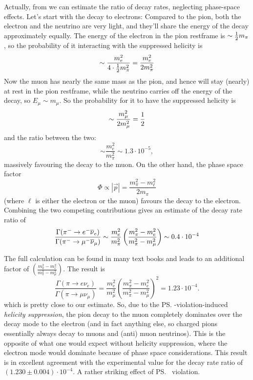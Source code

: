 Actually, from \label{eq:wrongHeliProb} we can estimate the ratio of
 decay rates, neglecting phase-space effects. Let's start with the
 decay to electrons: Compared to the pion, both the electron and the
 neutrino are very light, and they'll share the energy of the decay
 approximately equally. The energy of the electron in the pion
 restframe is $\sim \frac{1}{2} m_{\pi}$, so the probability of it
 interacting with the suppressed helicity is
\begin{equation}
 \sim \frac{m_e^2}{4 \cdot \frac{1}{2} m_{\pi}^2}
 = \frac{m_e^2}{2 m_{\pi}^2}
\end{equation}
 Now the muon has nearly the same mass as the pion, and hence will
 stay (nearly) at rest in the pion restframe, while the neutrino
 carries off the energy of the decay, so $E_{\mu} \sim m_{\mu}$. So
 the probability for it to have the suppressed helicity is
\begin{equation}
 \sim \frac{m_{\mu}^2}{2 m_{\mu}^2} = \frac{1}{2}
\end{equation}
 and the ratio between the two:
\begin{equation}
 \sim \frac{m_e^2}{m_{\pi}^2} \sim 1.3\cdot 10^{-5},
\end{equation}
 massively favouring the decay to the muon.
 On the other hand, the phase space factor
 \begin{equation}
 \Phi \propto |\vec{p}| = 
 \frac{m^2_{\pi} - m^2_{\ell}}{2 m_{\pi}}
 \end{equation}
(where $\ell$ is either the electron or the muon) favours the decay to the electron. Combining the two competing contributions gives an estimate of the decay rate ratio of
 \begin{equation}
 \frac{\Gamma({\rm \pi^-} \to e^- \overline{\nu}_e)}{
    \Gamma({\rm \pi^-} \to \mu^- \overline{\nu}_{\mu})}
\sim
 \frac{m_e^2}{m_{\pi}^2} 
    \left(
     \frac{m^2_{\pi} - m^2_{e}}{
     m^2_{\pi} - m^2_{\mu}}
    \right)
 \sim 0.4\cdot 10^{-4}
\end{equation}


 The full calculation can be found in many text
 books and leads to an additional factor of 
 $\left(
     \frac{m^2_{\pi} - m^2_{e}}{
     m^2_{\pi} - m^2_{\mu}}
    \right)$. 
The result is
\begin{equation}
 \frac{\Gamma(\pi \to e \nu_e)}{\Gamma(\pi \to \mu \nu_{\mu})}
=
\frac{m_e^2}{m_{\mu}^2} \left(\frac{m^2_{\pi} - m^2_{e}}{m^2_{\pi} -
  m^2_{\mu}}\right)^2
= 1.23 \cdot 10^{-4}.
\end{equation}
which is pretty close to our estimate.
So, due to the \ps-violation-induced \emph{helicity suppression}, the pion decay to the muon completely dominates over the decay mode to the electron (and in fact anything else, so charged pions essentially always decay to muons and (anti) muon neutrinos). This is the opposite of what one would expect without helicity suppression, where the electron mode would dominate because of phase space considerations. This result is in excellent agreement with the experimental value for the decay rate ratio of $(1.230\pm 0.004) \cdot
 10^{-4}$. 
A rather striking effect of \ps\ violation.

